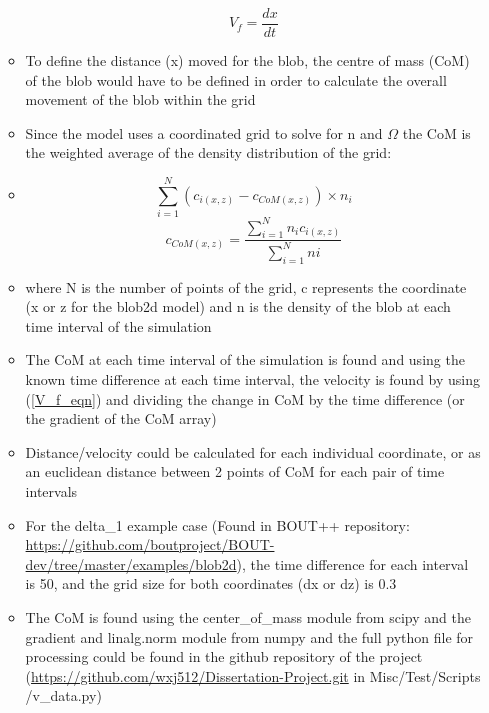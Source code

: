 \documentclass{article}
\begin{document}
\begin{arrowlist}
\begin{itemize}
\begin{itemize}
                \begin{equation}\label{V_f_eqn}
                    V_f=\frac{dx}{dt}
                \end{equation}
                \item To define the distance (x) moved for the blob, the centre of mass (CoM) of the blob would have to be defined in order to calculate the overall movement of the blob within the grid
                \item Since the model uses a coordinated grid to solve for n and $\Omega$ the CoM is the weighted average of the density distribution of the grid:
                \item[] \[ \sum_{i=1}^{N} \left(c_{i(x,z)}-c_{CoM(x,z)}\right)\times n_i \]
                \begin{equation}
                    c_{CoM(x,z)}=\frac{\sum_{i=1}^{N} n_ic_{i(x,z)}}{\sum_{i=1}^{N} ni}
                \end{equation} 
                \item where N is the number of points of the grid, c represents the coordinate (x or z for the blob2d model) and n is the density of the blob at each time interval of the simulation
                \item The CoM at each time interval of the simulation is found and using the known time difference at each time interval, the velocity is found by using (\ref{V_f_eqn}) and dividing the change in CoM by the time difference (or the gradient of the CoM array)
                \item Distance/velocity could be calculated for each individual coordinate, or as an euclidean distance between 2 points of CoM for each pair of time intervals
                \item For the delta\_1 example case (Found in BOUT++ repository: \url {https://github.com/boutproject/BOUT-dev/tree/master/examples/blob2d}), the time difference for each interval is 50, and the grid size for both coordinates (dx or dz) is 0.3
                \item The CoM is found using the center\_of\_mass module from scipy and the gradient and linalg.norm module from numpy and the full python file for processing could be found in the github repository of the project (\url{https://github.com/wxj512/Dissertation-Project.git} in Misc/Test/Scripts \-/v\_data.py)
            \end{itemize}  
       \end{itemize}


\end{arrowlist}
\end{document}
